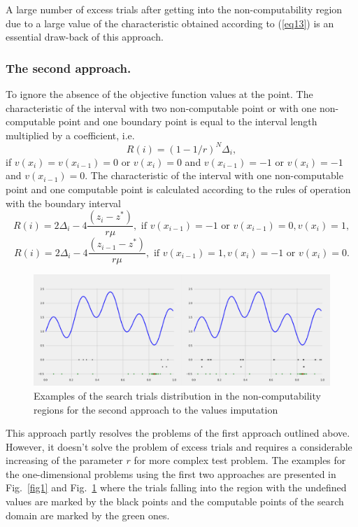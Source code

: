 \documentclass[runningheads]{llncs}
\begin{document}
A large number of excess trials after getting into the non-computability region due to a large value of the characteristic obtained according to (\ref{eq13}) is an essential draw-back of this approach.

\subsubsection{The second approach.} To ignore the absence of the objective function values at the point. The characteristic of the interval with two non-computable point or with one non-computable point and one boundary point is equal to the interval length multiplied by a coefficient, i.e.
\begin{equation}\label{eq14} 
R(i)={(1-{1}/{r})}^N \Delta _i,
\end{equation}
if $v(x_i)=v(x_{i-1})=0$ or $v(x_i)=0$ and $v(x_{i-1})=-1$ or $v(x_i)=-1$ and $v(x_{i-1})=0$.
The characteristic of the interval with one non-computable point and one computable point is calculated according to the rules of operation with the boundary interval
\begin{equation}\label{eq15} 
R(i)=2\Delta _i-4 \frac {(z_i-z^*)}{r \mu},\text{ if } v(x_{i-1})=-1  \text{ or } v(x_{i-1})=0, v(x_i)=1,
\end{equation}
\begin{equation}\label{eq16} 
R(i)=2\Delta _i-4 \frac {(z_{i-1}-z^*)}{r \mu},\text{ if } v(x_{i-1})=1, v(x_i)=-1 \text{ or } v(x_i)=0.
\end{equation}

\begin{figure}
\includegraphics[width=\textwidth]{fig2.png}
\caption{Examples of the search trials distribution in the non-computability regions for the second approach to the values imputation} \label{fig2}
\end{figure}

This approach partly resolves the problems of the first approach outlined above. However, it doesn’t solve the problem of excess trials and requires a considerable increasing of the parameter $r$ for more complex test problem. The examples for the one-dimensional problems using the first two approaches are presented in Fig.~\ref{fig1} and Fig.~\ref{fig2} where the trials falling into the region with the undefined values are marked by the black points and the computable points of the search domain are marked by the green ones. 
\end{document}
